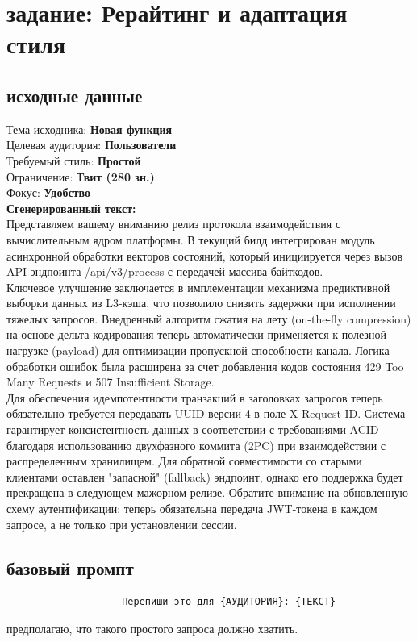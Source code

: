 \section{задание: Рерайтинг и адаптация стиля}
\subsection{исходные данные}
\indent Тема исходника: \textbf{Новая функция} \\
\indent Целевая аудитория: \textbf{Пользователи} \\
\indent Требуемый стиль: \textbf{Простой} \\
\indent Ограничение: \textbf{ Твит (280 зн.) } \\
\indent Фокус: \textbf{Удобство} \\
\newline
\indent \textbf{Сгенерированный текст:} \\
\indent Представляем вашему вниманию релиз протокола взаимодействия с вычислительным ядром платформы. В текущий билд интегрирован модуль асинхронной обработки векторов состояний, который инициируется через вызов API-эндпоинта /api/v3/process с передачей массива байткодов. \\ 
\indent Ключевое улучшение заключается в имплементации механизма предиктивной выборки данных из L3-кэша, что позволило снизить задержки при исполнении тяжелых запросов. Внедренный алгоритм сжатия на лету (on-the-fly compression) на основе дельта-кодирования теперь автоматически применяется к полезной нагрузке (payload) для оптимизации пропускной способности канала. Логика обработки ошибок была расширена за счет добавления кодов состояния 429 Too Many Requests и 507 Insufficient Storage. \\
\indent Для обеспечения идемпотентности транзакций в заголовках запросов теперь обязательно требуется передавать UUID версии 4 в поле X-Request-ID. Система гарантирует консистентность данных в соответствии с требованиями ACID благодаря использованию двухфазного коммита (2PC) при взаимодействии с распределенным хранилищем. Для обратной совместимости со старыми клиентами оставлен "запасной" (fallback) эндпоинт, однако его поддержка будет прекращена в следующем мажорном релизе. Обратите внимание на обновленную схему аутентификации: теперь обязательна передача JWT-токена в каждом запросе, а не только при установлении сессии.
\subsection{базовый промпт}
\begin{verbatim}
					Перепиши это для {АУДИТОРИЯ}: {ТЕКСТ}
\end{verbatim}
предполагаю, что такого простого запроса должно хватить.
